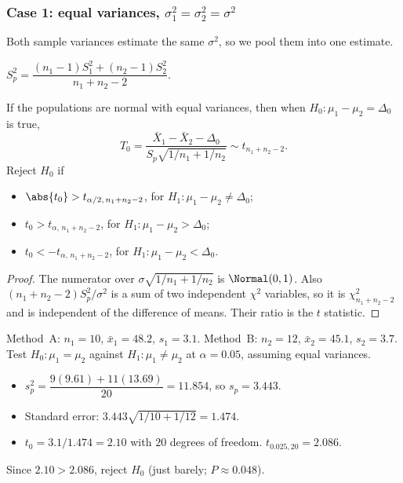 \subsubsection*{Case 1: equal variances, $\sigma_1^2=\sigma_2^2=\sigma^2$}

Both sample variances estimate the same $\sigma^2$, so we pool them into one estimate.

\begin{definition}
$S_p^2=\dfrac{(n_1-1)S_1^2+(n_2-1)S_2^2}{n_1+n_2-2}$.
\end{definition}

\begin{theorem}\label{thm:pooledt}
If the populations are normal with equal variances, then when $H_0:\mu_1-\mu_2=\Delta_0$ is true,
\[ T_0=\frac{\bar{X}_1-\bar{X}_2-\Delta_0}{S_p\sqrt{1/n_1+1/n_2}}\sim t_{n_1+n_2-2}. \]
Reject $H_0$ if
\begin{itemize}
  \item $\abs{t_0}>t_{\alpha/2,\,n_1+n_2-2}$, for $H_1:\mu_1-\mu_2\ne\Delta_0$;
  \item $t_0>t_{\alpha,\,n_1+n_2-2}$, for $H_1:\mu_1-\mu_2>\Delta_0$;
  \item $t_0<-t_{\alpha,\,n_1+n_2-2}$, for $H_1:\mu_1-\mu_2<\Delta_0$.
\end{itemize}
\end{theorem}

\begin{proof}
The numerator over $\sigma\sqrt{1/n_1+1/n_2}$ is $\Normal(0,1)$. Also $(n_1+n_2-2)S_p^2/\sigma^2$ is a sum of two independent $\chi^2$ variables, so it is $\chi^2_{n_1+n_2-2}$ and is independent of the difference of means. Their ratio is the $t$ statistic.
\end{proof}

\begin{example}\label{ex:pooled}
Method~A: $n_1=10$, $\bar{x}_1=48.2$, $s_1=3.1$. Method~B: $n_2=12$, $\bar{x}_2=45.1$, $s_2=3.7$. Test $H_0:\mu_1=\mu_2$ against $H_1:\mu_1\ne\mu_2$ at $\alpha=0.05$, assuming equal variances.
\begin{itemize}
  \item $s_p^2=\dfrac{9(9.61)+11(13.69)}{20}=11.854$, so $s_p=3.443$.
  \item Standard error: $3.443\sqrt{1/10+1/12}=1.474$.
  \item $t_0=3.1/1.474=2.10$ with $20$ degrees of freedom. $t_{0.025,20}=2.086$.
\end{itemize}
Since $2.10>2.086$, reject $H_0$ (just barely; $P\approx0.048$).
\end{example}

